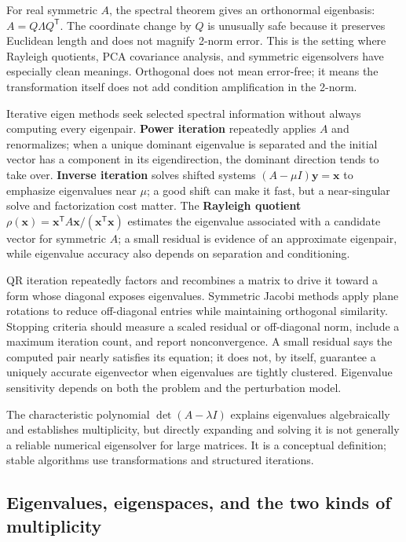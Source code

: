 For real symmetric \(A\), the spectral theorem gives an orthonormal eigenbasis: \(A=Q\Lambda Q^\mathsf T\). The coordinate change by \(Q\) is unusually safe because it preserves Euclidean length and does not magnify 2-norm error. This is the setting where Rayleigh quotients, PCA covariance analysis, and symmetric eigensolvers have especially clean meanings. Orthogonal does not mean error-free; it means the transformation itself does not add condition amplification in the 2-norm.

Iterative eigen methods seek selected spectral information without always computing every eigenpair. \textbf{Power iteration} repeatedly applies \(A\) and renormalizes; when a unique dominant eigenvalue is separated and the initial vector has a component in its eigendirection, the dominant direction tends to take over. \textbf{Inverse iteration} solves shifted systems \((A-\mu I)\mathbf y=\mathbf x\) to emphasize eigenvalues near \(\mu\); a good shift can make it fast, but a near-singular solve and factorization cost matter. The \textbf{Rayleigh quotient} \(\rho(\mathbf x)=\mathbf x^\mathsf T A\mathbf x/(\mathbf x^\mathsf T\mathbf x)\) estimates the eigenvalue associated with a candidate vector for symmetric \(A\); a small residual is evidence of an approximate eigenpair, while eigenvalue accuracy also depends on separation and conditioning.

QR iteration repeatedly factors and recombines a matrix to drive it toward a form whose diagonal exposes eigenvalues. Symmetric Jacobi methods apply plane rotations to reduce off-diagonal entries while maintaining orthogonal similarity. Stopping criteria should measure a scaled residual or off-diagonal norm, include a maximum iteration count, and report nonconvergence. A small residual says the computed pair nearly satisfies its equation; it does not, by itself, guarantee a uniquely accurate eigenvector when eigenvalues are tightly clustered. Eigenvalue sensitivity depends on both the problem and the perturbation model.

The characteristic polynomial \(\det(A-\lambda I)\) explains eigenvalues algebraically and establishes multiplicity, but directly expanding and solving it is not generally a reliable numerical eigensolver for large matrices. It is a conceptual definition; stable algorithms use transformations and structured iterations.

\subsection{Eigenvalues, eigenspaces, and the two kinds of multiplicity}\label{01-foundations-i-ch020-eigenvalues-eigenspaces-and-the-two-kinds-of-multiplicity}

